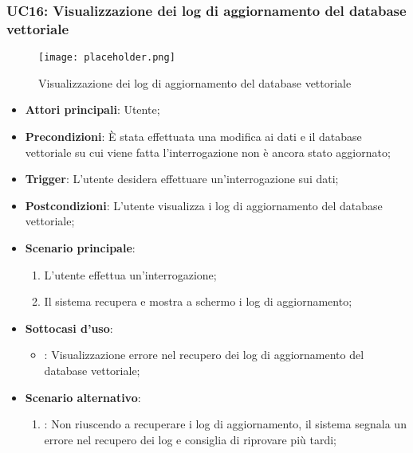\hypertarget{UC16}{}
\subsubsection{UC16: Visualizzazione dei log di aggiornamento del database vettoriale}

\begin{figure}[h]
    \centering
    \texttt{[image: placeholder.png]}
    \caption{Visualizzazione dei log di aggiornamento del database vettoriale}
\end{figure}

\begin{itemize}
    \item \textbf{Attori principali}: Utente;
    \item \textbf{Precondizioni}: È stata effettuata una modifica ai dati e il database vettoriale su cui viene fatta l'interrogazione non è ancora stato aggiornato;
    \item \textbf{Trigger}: L'utente desidera effettuare un'interrogazione sui dati;
    \item \textbf{Postcondizioni}: L'utente visualizza i log di aggiornamento del database vettoriale;
    \item \textbf{Scenario principale}:
    \begin{enumerate}
        \item L'utente effettua un'interrogazione;
        \item Il sistema recupera e mostra a schermo i log di aggiornamento;
    \end{enumerate}
    \item \textbf{Sottocasi d'uso}:
        \begin{itemize}
            \item {}: Visualizzazione errore nel recupero dei log di aggiornamento del database vettoriale;
        \end{itemize}
    \item \textbf{Scenario alternativo}:
    \begin{enumerate}
        \item {}: Non riuscendo a recuperare i log di aggiornamento, il sistema segnala un errore nel recupero dei log e consiglia di riprovare più tardi;
    \end{enumerate}
\end{itemize}

